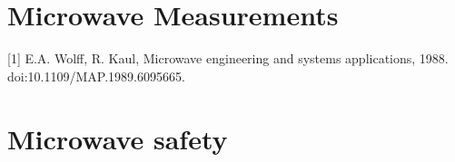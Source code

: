 \section{Microwave Measurements}
[1] E.A. Wolff, R. Kaul, Microwave engineering and systems applications, 1988. doi:10.1109/MAP.1989.6095665.

\section{Microwave safety}
\parencite[sec.5.8.3]{Benford2015}


